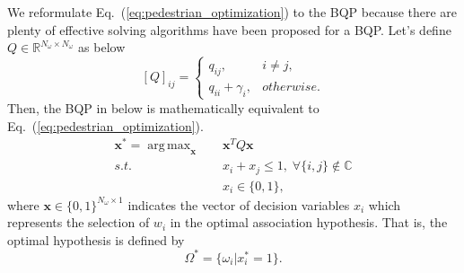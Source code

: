 \documentclass[runningheads]{llncs}
\DeclareMathOperator*{\argmax}{arg\,max}
\begin{document}
We reformulate Eq.~(\ref{eq:pedestrian_optimization}) to the BQP because there are plenty of effective solving algorithms have been proposed for a BQP.
Let's define $Q \in \mathbb{R}^{N_{\omega} \times N_{\omega}}$ as below
\begin{equation}
   \label{eq:Q}
   [Q]_{ij} = 
      \begin{cases}
         q_{ij},            & i \neq j, \\
         q_{ii} + \gamma_i, & otherwise.
      \end{cases}
\end{equation}
Then, the BQP in below is mathematically equivalent to Eq.~(\ref{eq:pedestrian_optimization}).
\begin{equation}
   \label{eq:quadratic_programming}
   \begin{aligned}
      \mathbf{x}^* = \argmax_{\mathbf{x}} & \quad \mathbf{x}^T Q \mathbf{x} \\
                                     s.t. & \quad x_i + x_j \leq 1, \; \forall \{i,j\} \notin \mathbb{C} \\
                                          & \quad x_i \in \{0,1\},
   \end{aligned}
\end{equation}
where $\mathbf{x} \in \{0,1\}^{N_{\omega} \times 1}$ indicates the vector of decision variables $x_i$ which represents the selection of $w_i$ in the optimal association hypothesis.
That is, the optimal hypothesis is defined by
\begin{equation}
   \label{eq:optimal_hypothesis}
   \Omega^* = \{\omega_i | x_i^* = 1\}.
\end{equation}

\end{document}

